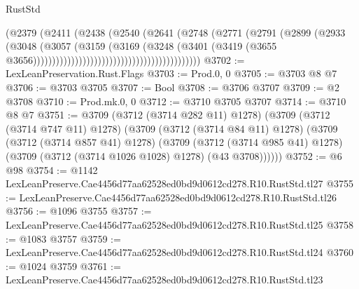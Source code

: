 \begin{lexlean}{RustStd}
\begin{coremodule}
                                                        (@2379
                                                          (@2411
                                                            (@2438
                                                              (@2540
                                                                (@2641
                                                                  (@2748
                                                                    (@2771
                                                                      (@2791
                                                                        (@2899
                                                                          (@2933
                                                                            (@3048
                                                                              (@3057
                                                                                (@3159
                                                                                  (@3169
                                                                                    (@3248
                                                                                      (@3401
                                                                                        (@3419
                                                                                          (@3655
                                                                                            @3656))))))))))))))))))))))))))))))))))))))))))))
@3702 := LexLeanPreservation.Rust.Flags
@3703 := Prod.{0, 0}
@3705 := @3703 @8 @7
@3706 := @3703 @3705
@3707 := Bool
@3708 := @3706 @3707
@3709 := @2 @3708
@3710 := Prod.mk.{0, 0}
@3712 := @3710 @3705 @3707
@3714 := @3710 @8 @7
@3751 := @3709
    (@3712 (@3714 @282 @11) @1278)
    (@3709
      (@3712 (@3714 @747 @11) @1278)
      (@3709
        (@3712 (@3714 @84 @11) @1278)
        (@3709
          (@3712 (@3714 @857 @41) @1278)
          (@3709
            (@3712 (@3714 @985 @41) @1278)
            (@3709 (@3712 (@3714 @1026 @1028) @1278) (@43 @3708))))))
@3752 := @6 @98
@3754 := @1142 LexLeanPreserve.Cae4456d77aa62528ed0bd9d0612cd278.R10.RustStd.tl27
@3755 := LexLeanPreserve.Cae4456d77aa62528ed0bd9d0612cd278.R10.RustStd.tl26
@3756 := @1096 @3755
@3757 := LexLeanPreserve.Cae4456d77aa62528ed0bd9d0612cd278.R10.RustStd.tl25
@3758 := @1083 @3757
@3759 := LexLeanPreserve.Cae4456d77aa62528ed0bd9d0612cd278.R10.RustStd.tl24
@3760 := @1024 @3759
@3761 := LexLeanPreserve.Cae4456d77aa62528ed0bd9d0612cd278.R10.RustStd.tl23

\end{coremodule}
\end{lexlean}
